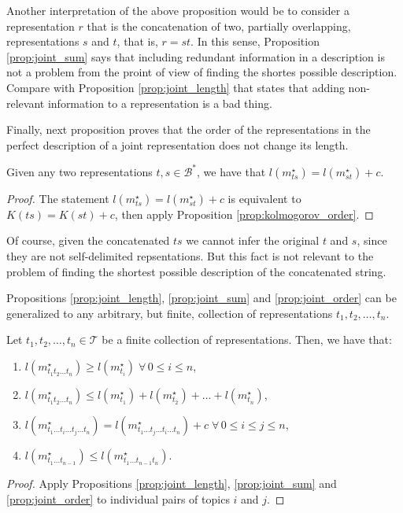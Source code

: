 Another interpretation of the above proposition would be to consider a representation $r$ that is the concatenation of two, partially overlapping, representations $s$ and $t$, that is, $r = st$. In this sense, Proposition \ref{prop:joint_sum} says that including redundant information in a description is not a problem from the proint of view of finding the shortes possible description. Compare with Proposition \ref{prop:joint_length} that states that adding non-relevant information to a representation is a bad thing.

Finally, next proposition proves that the order of the representations in the perfect description of a joint representation does not change its length.

\begin{proposition}
\label{prop:joint_order}
Given any two representations $t, s \in \mathcal{B}^\ast$, we have that $l \left( m_{ts}^{\star} \right) = l \left( m_{st}^{\star} \right) + c$.
\end{proposition}
\begin{proof}
The statement $l \left( m_{ts}^{\star} \right) = l \left( m_{st}^{\star} \right) + c$ is equivalent to $K(ts) = K(st) + c$, then apply Proposition \ref{prop:kolmogorov_order}.
\end{proof}

Of course, given the concatenated $ts$ we cannot infer the original $t$ and $s$, since they are not self-delimited repsentations. But this fact is not relevant to the problem of finding the shortest possible description of the concatenated string.

Propositions \ref{prop:joint_length}, \ref{prop:joint_sum} and \ref{prop:joint_order} can be generalized to any arbitrary, but finite, collection of representations $t_1, t_2, \ldots, t_n$.

\begin{proposition}
\label{prop:joint_multiple_topics}
Let $t_1, t_2, \ldots, t_n \in \mathcal{T}$ be a finite collection of representations. Then, we have that:

\renewcommand{\theenumi}{\roman{enumi}}
\begin{enumerate}
\item $l(m_{t_1 t_2 \ldots t_n}^\star) \geq l(m_ {t_i}^\star) \; \forall \, 0 \leq i \leq n$,
\item $l(m_{t_1 t_2 \ldots t_n}^\star) \leq l(m_ {t_1}^\star) + l(m_ {t_2}^\star) + \ldots + l(m_ {t_n}^\star)$,
\item $l(m_{t_1 \ldots t_i \ldots t_j \ldots t_n}^\star) = l(m_{t_1 \ldots t_j \ldots t_i \ldots t_n}^\star) + c \; \forall \, 0 \leq i \leq j \leq n$,
\item $l(m_{t_1 \ldots t_{n-1}}^\star) \leq l(m_{t_1 \ldots t_{n-1} t_n}^\star)$.
\end{enumerate}
\end{proposition}
\begin{proof}
Apply Propositions \ref{prop:joint_length}, \ref{prop:joint_sum} and \ref{prop:joint_order} to individual pairs of topics $i$ and $j$.
\end{proof}

